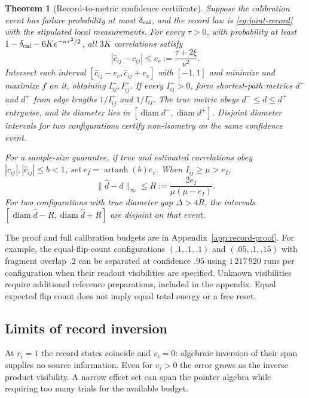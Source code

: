 \documentclass[12pt,a4paper]{article}
\newtheorem{theorem}{Theorem}[section]
\begin{document}
\begin{theorem}[Record-to-metric confidence certificate]
\label{thm:record-metric}
Suppose the calibration event has failure probability at most
$\delta_{\rm cal}$, and the record law is \eqref{eq:joint-record} with
the stipulated local measurements. For every $\tau>0$, with
probability at least
$1-\delta_{\rm cal}-6K e^{-n\tau^2/2}$, all $3K$ correlations satisfy
\begin{equation}
|\widehat c_{ij}-c_{ij}|
 \le e_c:=\frac{\tau+2\xi}{\nu^2}.
\label{eq:ec}
\end{equation}
Intersect each interval $[\widehat c_{ij}-e_c,\widehat c_{ij}+e_c]$
with $[-1,1]$ and minimize and maximize $f$ on it, obtaining
$I^-_{ij},I^+_{ij}$. If every $I^-_{ij}>0$, form shortest-path metrics
$d^-$ and $d^+$ from edge lengths $1/I^+_{ij}$ and $1/I^-_{ij}$.
The true metric obeys $d^-\le d\le d^+$ entrywise, and its diameter
lies in $[\operatorname{diam}d^-,\operatorname{diam}d^+]$.
Disjoint diameter intervals for two configurations certify
non-isometry on the same confidence event.

For a sample-size guarantee, if true and estimated correlations obey
$|c_{ij}|,|\widehat c_{ij}|\le b<1$, set
$e_I=\operatorname{artanh}(b)e_c$. When $I_{ij}\ge\mu>e_I$,
\begin{equation}
\|\widehat d-d\|_\infty
 \le R:=\frac{2e_I}{\mu(\mu-e_I)} .
\label{eq:diam-radius}
\end{equation}
For two configurations with true diameter gap $\Delta>4R$, the
intervals
$[\operatorname{diam}\widehat d-R,\operatorname{diam}\widehat d+R]$
are disjoint on that event.
\end{theorem}

The proof and full calibration budgets are in
Appendix~\ref{app:record-proof}. For example, the equal-flip-count
configurations $(.1,.1,.1)$ and $(.05,.1,.15)$ with fragment overlap
$.2$ can be separated at confidence $.95$ using $1\,217\,920$
runs per configuration when their readout visibilities are specified.
Unknown visibilities require additional reference preparations,
included in the appendix. Equal expected flip count does not imply
equal total energy or a free reset.

\subsection{Limits of record inversion}

At $r_i=1$ the record states coincide and $v_i=0$: algebraic inversion
of their span supplies no source information. Even for $v_i>0$ the
error grows as the inverse product visibility. A narrow effect set
can span the pointer algebra while requiring too many trials for
the available budget.
\end{document}

